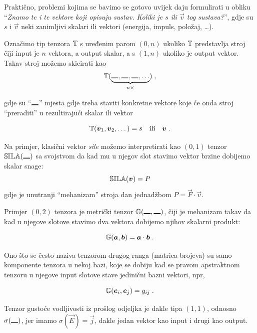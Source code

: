Praktično, problemi kojima se bavimo se gotovo uvijek daju formulirati
u obliku ``\emph{Znamo te i te vektore koji opisuju sustav. Koliki
je $s$ ili $\vec{v}$ tog sustava?}'', gdje su $s$ i $\vec{v}$ neki
zanimljivi skalari ili vektori (energija, impuls, položaj, \dots).

Označimo tip tenzora $\mathbb{T}$ s uređenim parom $(0, n)$ ukoliko 
$\mathbb{T}$ predstavlja stroj čiji input je $n$ vektora, a output skalar,
a s $(1, n)$ ukoliko je output vektor. Takav stroj
možemo skicirati kao
\begin{equation}
   \bbtensor{T}(\underbrace{\slot, \slot, \slot, \dots}_{n \times})  \;,
\end{equation}

gdje su ``$\rule{1em}{1pt}$'' mjesta gdje treba staviti konkretne vektore
koje će onda stroj ``preraditi'' u rezultirajući skalar ili vektor

\begin{equation}
   \bbtensor{T}(\vec{v}_1, \vec{v}_2, \dots) = s \quad \text{ili} \quad \vec{v} \;.
\end{equation}

Na primjer, klasični vektor \emph{sile} možemo interpretirati kao
$(0, 1)$ tenzor $\bbtensor{SILA}(\slot)$ sa svojstvom da kad mu
u njegov slot stavimo vektor brzine dobijemo skalar snage:
\begin{equation}
   \bbtensor{SILA}(\vec{v}) = P
\end{equation}
gdje je unutranji ``mehanizam'' stroja dan jednadžbom $P = \vec{F}\cdot\vec{v}$.

Primjer $(0,2)$ tenzora je metrički tenzor $\bbtensor{G}(\slot, \slot)$,
čiji je mehanizam takav da kad u njegove slotove stavimo dva vektora
dobijemo njihov skalarni produkt:

\begin{equation}
   \bbtensor{G}(\vec{a}, \vec{b}) = \vec{a}\cdot\vec{b} \;.
\end{equation}

Ono što se često naziva tenzorom drugog ranga (matrica brojeva) su
samo komponente tenzora u nekoj bazi, koje se
dobiju kad se pravom apstraktnom tenzoru u njegove input slotove
stave jedinični bazni vektori, npr,

\begin{equation}
   \bbtensor{G}(\vec{e}_i, \vec{e}_j) = g_{ij} \;.
\label{eq:Gkomponente}
\end{equation}

Tenzor gustoće vodljivosti iz prošlog odjeljka je dakle
tipa $(1,1)$, odnosno $\sigma(\slot)$, jer imamo
$\sigma(\vec{E}) = \vec{j}$, dakle jedan vektor kao input
i drugi kao output.

